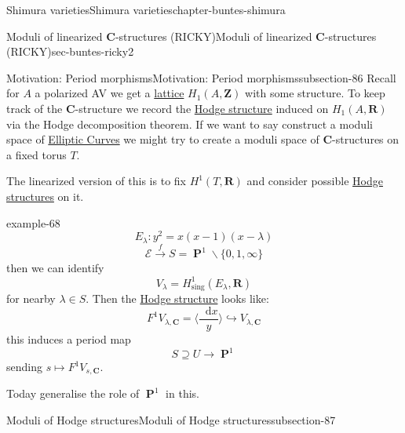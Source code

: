\documentclass[oneside,10pt,]{book}
\numberwithin{equation}{section}
\newcommand{\diff}{\mathop{}\!\mathrm{d}}
\newcommand{\ZZ}{\mathbf{Z}}
\newcommand{\RR}{\mathbf{R}}
\newcommand{\CC}{\mathbf{C}}
\newcommand{\sing}{\mathrm{sing}}
\DeclareMathOperator{\PP}{\mathbf{P}}
\begin{document}
\begin{chapterptx}{Shimura varieties}{}{Shimura varieties}{}{}{chapter-buntes-shimura}
\begin{sectionptx}{Moduli of linearized \(\CC\)-structures (RICKY)}{}{Moduli of linearized \(\CC\)-structures (RICKY)}{}{}{sec-buntes-ricky2}
%
%
\typeout{************************************************}
\typeout{************************************************}
%
\begin{subsectionptx}{Motivation: Period morphisms}{}{Motivation: Period morphisms}{}{}{subsection-86}
\hypertarget{p-1176}{}%
Recall for  \(A\) a  polarized AV we get a \hyperref[def-buntes-lattice]{lattice} \(H_1(A,\ZZ)\) with some structure. To keep track of the \(\CC\)-structure  we record the \hyperref[def-hodge-str]{Hodge structure} induced on \(H_1(A,\RR)\) via the Hodge decomposition theorem. If we want to say construct a moduli space of \hyperref[def-supersing-isog-ec]{Elliptic Curves} we might try to create a moduli space of \(\CC\)-structures on a fixed torus \(T\).%
\par
\hypertarget{p-1177}{}%
The linearized version of this is to fix \(H^1(T, \RR)\) and consider possible \hyperref[def-hodge-str]{Hodge structures} on it.%
\begin{example}{}{example-68}%
\hypertarget{p-1178}{}%
%
\begin{equation*}
E_\lambda \colon y^2 = x(x-1) (x-\lambda)
\end{equation*}
%
\begin{equation*}
\mathcal E \xrightarrow f S = \PP^1 \smallsetminus \{0,1,\infty\}
\end{equation*}
then we can identify%
\begin{equation*}
V_\lambda = H^1_\sing(E_\lambda, \RR)
\end{equation*}
for nearby \(\lambda \in S\). Then the \hyperref[def-hodge-str]{Hodge structure} looks like:%
\begin{equation*}
F^1 V_{\lambda, \CC} = \langle \frac{\diff x}{y} \rangle \hookrightarrow V_{\lambda, \CC}
\end{equation*}
this induces a period map%
\begin{equation*}
S\supseteq U \to \PP^1
\end{equation*}
sending \(s \mapsto F^1V_{s, \CC}\).%
\end{example}
\hypertarget{p-1179}{}%
Today generalise the role of \(\PP^1\) in this.%
\end{subsectionptx}
%
%
\typeout{************************************************}
\typeout{************************************************}
%
\begin{subsectionptx}{Moduli of Hodge structures}{}{Moduli of Hodge structures}{}{}{subsection-87}

\end{subsectionptx}
\end{sectionptx}
\end{chapterptx}
\end{document}
